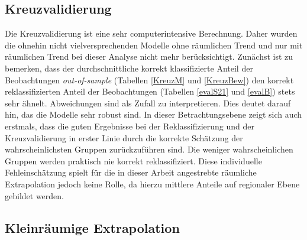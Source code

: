 \documentclass{Vorlage}
\begin{document}
\subsection{Kreuzvalidierung}
Die Kreuzvalidierung ist eine sehr computerintensive Berechnung. Daher wurden die ohnehin nicht vielversprechenden Modelle ohne räumlichen Trend und nur mit räumlichen Trend bei dieser Analyse nicht mehr berücksichtigt. Zunächst ist zu bemerken, dass der durchschnittliche korrekt klassifizierte Anteil der Beobachtungen \textit{out-of-sample} (Tabellen \ref{KreuzM} und \ref{KreuzBew}) den korrekt reklassifizierten Anteil der Beobachtungen (Tabellen \ref{evalS21} und \ref{evalB}) stets sehr ähnelt. Abweichungen sind als Zufall zu interpretieren. Dies deutet darauf hin, das die Modelle sehr robust sind.
In dieser Betrachtungsebene zeigt sich auch erstmals, dass die guten Ergebnisse bei der Reklassifizierung und der Kreuzvalidierung in erster Linie durch die korrekte Schätzung der wahrscheinlichsten Gruppen zurückzuführen sind. Die weniger wahrscheinlichen Gruppen werden praktisch nie korrekt reklassifiziert. Diese individuelle Fehleinschätzung spielt für die in dieser Arbeit angestrebte räumliche Extrapolation jedoch keine Rolle, da hierzu mittlere Anteile auf regionaler Ebene gebildet werden.

\subsection{Kleinräumige Extrapolation}
\end{document}
